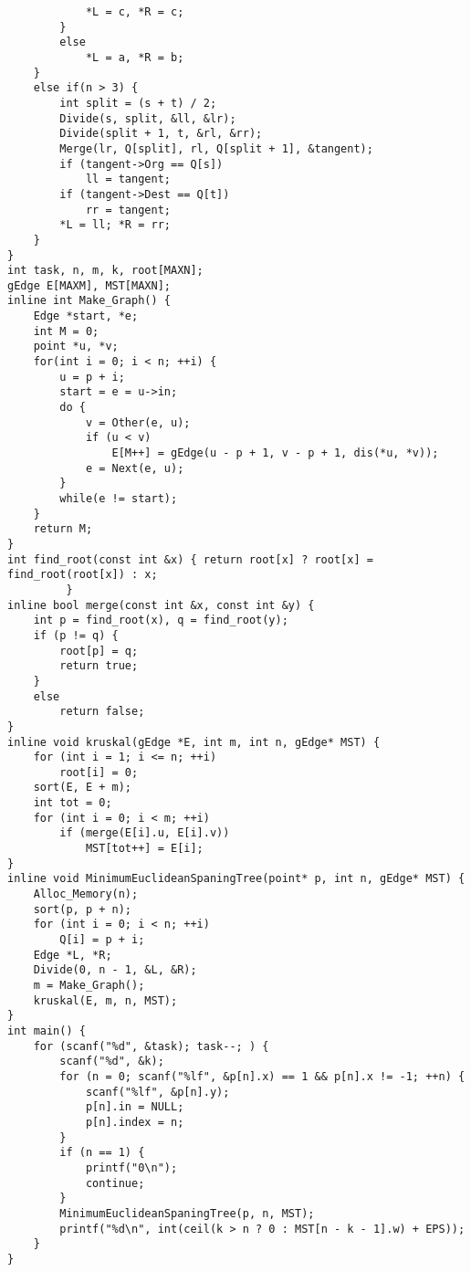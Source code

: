 \begin{lstlisting}
			*L = c, *R = c;
		}
		else
			*L = a, *R = b;
	}
	else if(n > 3) {
		int split = (s + t) / 2;
		Divide(s, split, &ll, &lr);
		Divide(split + 1, t, &rl, &rr);
		Merge(lr, Q[split], rl, Q[split + 1], &tangent);
		if (tangent->Org == Q[s])
			ll = tangent;
		if (tangent->Dest == Q[t])
			rr = tangent;
		*L = ll; *R = rr;
	}
}
int task, n, m, k, root[MAXN];
gEdge E[MAXM], MST[MAXN];
inline int Make_Graph() {
	Edge *start, *e;
	int M = 0;
	point *u, *v;
	for(int i = 0; i < n; ++i) {
		u = p + i;
		start = e = u->in;
		do {
			v = Other(e, u);
			if (u < v)
				E[M++] = gEdge(u - p + 1, v - p + 1, dis(*u, *v));
			e = Next(e, u);
		}
		while(e != start);
	}
	return M;
}
int find_root(const int &x) { return root[x] ? root[x] = find_root(root[x]) : x;
		 }
inline bool merge(const int &x, const int &y) {
	int p = find_root(x), q = find_root(y);
	if (p != q) {
		root[p] = q;
		return true;
	}
	else
		return false;
}
inline void kruskal(gEdge *E, int m, int n, gEdge* MST) {
	for (int i = 1; i <= n; ++i)
		root[i] = 0;
	sort(E, E + m);
	int tot = 0;
	for (int i = 0; i < m; ++i)
		if (merge(E[i].u, E[i].v))
			MST[tot++] = E[i];
}
inline void MinimumEuclideanSpaningTree(point* p, int n, gEdge* MST) {
	Alloc_Memory(n);
	sort(p, p + n);
	for (int i = 0; i < n; ++i)
		Q[i] = p + i;
	Edge *L, *R;
	Divide(0, n - 1, &L, &R);
	m = Make_Graph();
	kruskal(E, m, n, MST);
}
int main() {
	for (scanf("%d", &task); task--; ) {
		scanf("%d", &k);
		for (n = 0; scanf("%lf", &p[n].x) == 1 && p[n].x != -1; ++n) {
			scanf("%lf", &p[n].y);
			p[n].in = NULL;
			p[n].index = n;
		}
		if (n == 1) {
			printf("0\n");
			continue;
		}
		MinimumEuclideanSpaningTree(p, n, MST);
		printf("%d\n", int(ceil(k > n ? 0 : MST[n - k - 1].w) + EPS));
	}
}
\end{lstlisting}
